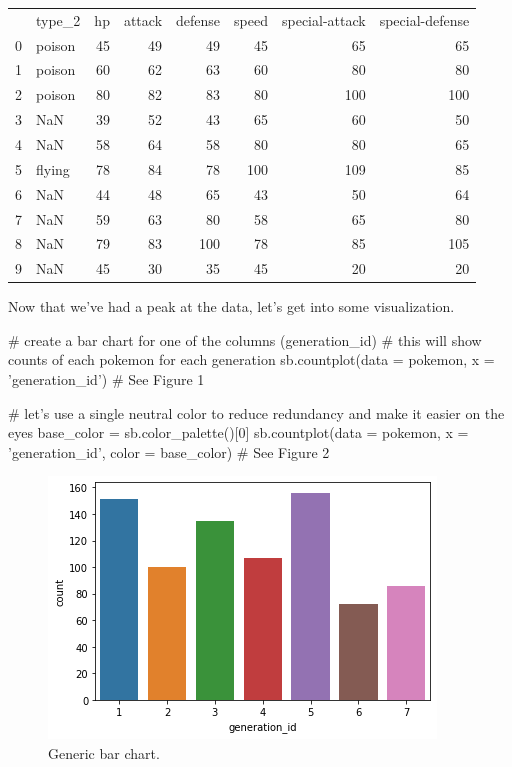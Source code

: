 \begin{center}
	\begin{tabular}{llrrrrrr}
		{} &  type\_2 &  hp &  attack &  defense &  speed &  special-attack &  special-defense \\
		0 &  poison &  45 &      49 &       49 &     45 &              65 &               65 \\
		1 &  poison &  60 &      62 &       63 &     60 &              80 &               80 \\
		2 &  poison &  80 &      82 &       83 &     80 &             100 &              100 \\
		3 &     NaN &  39 &      52 &       43 &     65 &              60 &               50 \\
		4 &     NaN &  58 &      64 &       58 &     80 &              80 &               65 \\
		5 &  flying &  78 &      84 &       78 &    100 &             109 &               85 \\
		6 &     NaN &  44 &      48 &       65 &     43 &              50 &               64 \\
		7 &     NaN &  59 &      63 &       80 &     58 &              65 &               80 \\
		8 &     NaN &  79 &      83 &      100 &     78 &              85 &              105 \\
		9 &     NaN &  45 &      30 &       35 &     45 &              20 &               20 \\
	\end{tabular}
\end{center}

Now that we've had a peak at the data, let's get into some visualization.

\begin{python}
	# create a bar chart for one of the columns (generation_id)
	# this will show counts of each pokemon for each generation
	sb.countplot(data = pokemon, x = 'generation_id')
	# See Figure 1
	
	# let's use a single neutral color to reduce redundancy and make it easier on the eyes
	base_color = sb.color_palette()[0]
	sb.countplot(data = pokemon, x = 'generation_id', color = base_color)
	# See Figure 2
\end{python}

\begin{figure}
	\includegraphics{images/figure1.png}
	\caption{Generic bar chart.}\label{fig:figure1}
\end{figure}

